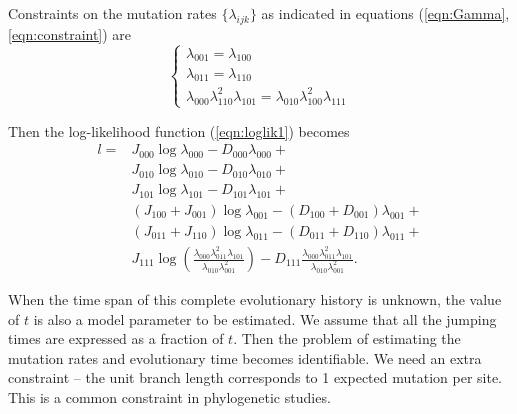 \documentclass[11pt]{article}
\begin{document}
Constraints on the mutation rates $\{\lambda_{ijk}\}$ as indicated in
equations (\ref{eqn:Gamma},\ref{eqn:constraint}) are
\begin{equation}\label{eqn:constraints}
\left\{
  \begin{array}{ll}
    \lambda_{001} = \lambda_{100}\\
    \lambda_{011} = \lambda_{110}\\
    \lambda_{000}\lambda_{110}^2\lambda_{101} = \lambda_{010}\lambda_{100}^2\lambda_{111}
  \end{array}
\right.
\end{equation}

Then the log-likelihood function (\ref{eqn:loglik1}) becomes
\begin{equation}\label{eqn:loglik2}
\begin{aligned}
l = & J_{000}\log\lambda_{000} - D_{000}\lambda_{000} + \\
& J_{010}\log\lambda_{010} - D_{010}\lambda_{010} + \\
& J_{101}\log\lambda_{101} - D_{101}\lambda_{101} + \\
& (J_{100} + J_{001})\log\lambda_{001} - (D_{100}+D_{001})\lambda_{001} +  \\
& (J_{011} + J_{110})\log\lambda_{011} - (D_{011}+D_{110})\lambda_{011} +  \\
& J_{111}\log(\frac{\lambda_{000}\lambda_{011}^2\lambda_{101}}{\lambda_{010}\lambda_{001}^2}) - D_{111}\frac{\lambda_{000}\lambda_{011}^2\lambda_{101}}{\lambda_{010}\lambda_{001}^2}.
\end{aligned}
\end{equation}

When the time span of this complete evolutionary history is unknown,
the value of $t$ is also a model parameter to be estimated. We assume
that all the jumping times are expressed as a fraction of $t$. Then
the problem of estimating the mutation rates and evolutionary time
becomes identifiable. We need an extra constraint -- the unit branch
length corresponds to 1 expected mutation per site. This is a common
constraint in phylogenetic studies.
\end{document}
